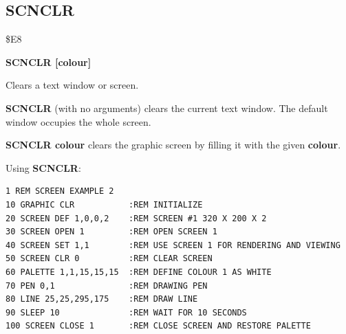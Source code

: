 \subsection{SCNCLR}
\begin{description}[leftmargin=2cm,style=nextline]
\item [Token:] \$E8
\item [Format:] {\bf SCNCLR [colour]}
\item [Usage:] Clears a text window or screen.

               {\bf SCNCLR} (with no arguments) clears the
               current text window. The default window
               occupies the whole screen.

               {\bf SCNCLR colour} clears the graphic screen by
               filling it with the given {\bf colour}.

\item [Example:] Using {\bf SCNCLR}:
\begin{tcolorbox}[colback=black,coltext=white]
\verbatimfont{\codefont}
\begin{verbatim}
1 REM SCREEN EXAMPLE 2
10 GRAPHIC CLR           :REM INITIALIZE
20 SCREEN DEF 1,0,0,2    :REM SCREEN #1 320 X 200 X 2
30 SCREEN OPEN 1         :REM OPEN SCREEN 1
40 SCREEN SET 1,1        :REM USE SCREEN 1 FOR RENDERING AND VIEWING
50 SCREEN CLR 0          :REM CLEAR SCREEN
60 PALETTE 1,1,15,15,15  :REM DEFINE COLOUR 1 AS WHITE
70 PEN 0,1               :REM DRAWING PEN
80 LINE 25,25,295,175    :REM DRAW LINE
90 SLEEP 10              :REM WAIT FOR 10 SECONDS
100 SCREEN CLOSE 1       :REM CLOSE SCREEN AND RESTORE PALETTE
\end{verbatim}
\end{tcolorbox}
\end{description}


\newpage

